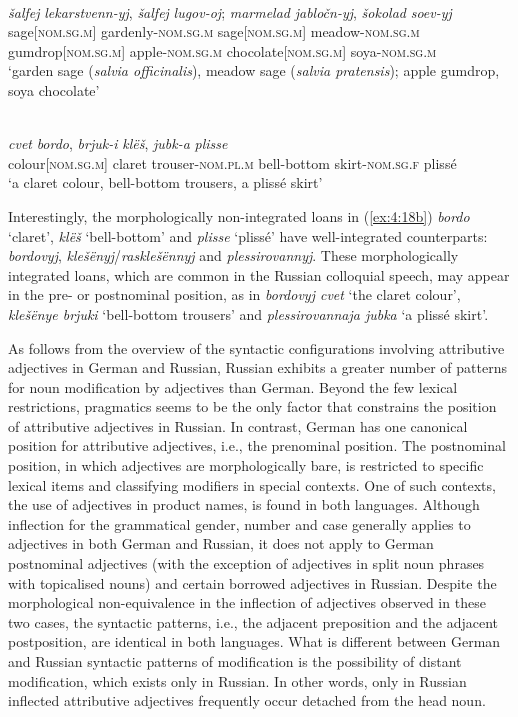 \ea
\ea{\label{ex:4:18a}}
\citep[203]{rusgramm-tom2}\\
\gll \textit{šalfej} \textit{lekarstvenn-yj}, \textit{šalfej} \textit{lugov-oj}; \textit{marmelad} \textit{jabločn-yj}, \textit{šokolad} \textit{soev-yj}\\
	sage[\textsc{nom.sg.m}] gardenly-\textsc{nom.sg.m} sage[\textsc{nom.sg.m}] meadow-\textsc{nom.sg.m} gumdrop[\textsc{nom.sg.m}] apple-\textsc{nom.sg.m} chocolate[\textsc{nom.sg.m}] soya-\textsc{nom.sg.m}\\
\glt `garden sage (\textit{salvia officinalis}), meadow sage (\textit{salvia pratensis}); apple gumdrop, soya chocolate'

\ex{\label{ex:4:18b}}
\citep[540]{rusgramm-tom1}\\
\gll \textit{cvet} \textit{bordo}, \textit{brjuk-i} \textit{klëš}, \textit{jubk-a} \textit{plisse}\\
	colour[\textsc{nom.sg.m}] claret trouser-\textsc{nom.pl.m} bell-bottom skirt-\textsc{nom.sg.f} plissé\\
\glt `a claret colour, bell-bottom trousers, a plissé skirt'
\z
\z

\noindent Interestingly, the morphologically non-integrated loans in (\ref{ex:4:18b}) \textit{bordo} `claret', \textit{klëš} `bell-bottom' and \textit{plisse} `plissé' have well-integrated counterparts: \textit{bordovyj}, \textit{klešënyj}\slash\textit{rasklešënnyj} and \textit{plessirovannyj}. These morphologically integrated loans, which are common in the Russian colloquial speech, may appear in the pre- or postnominal position,  as in \textit{bordovyj cvet} `the claret colour', \textit{klešënye brjuki} `bell-bottom trousers' and \textit{plessirovannaja jubka} `a plissé skirt'.

As follows from the overview of the syntactic configurations involving attributive adjectives in German and Russian, Russian exhibits a greater number of patterns for noun modification by adjectives than German. Beyond the few lexical restrictions, pragmatics seems to be the only factor that constrains the position of attributive adjectives in Russian. In contrast, German has one canonical position for attributive adjectives, i.e., the prenominal position. The postnominal position, in which adjectives are morphologically bare, is restricted to specific lexical items and classifying modifiers in special contexts. One of such contexts, the use of adjectives in product names, is found in both languages. Although inflection for the grammatical gender, number and case generally applies to adjectives in both German and Russian, it does not apply to German postnominal adjectives (with the exception of adjectives in split noun phrases with topicalised nouns) and certain borrowed adjectives in Russian. Despite the morphological non-equivalence in the inflection of adjectives observed in these two cases, the syntactic patterns, i.e., the adjacent preposition and the adjacent postposition, are identical in both languages. What is different between German and Russian syntactic patterns of modification is the possibility of distant modification, which exists only in Russian. In other words, only in Russian inflected attributive adjectives frequently occur detached from the head noun.

